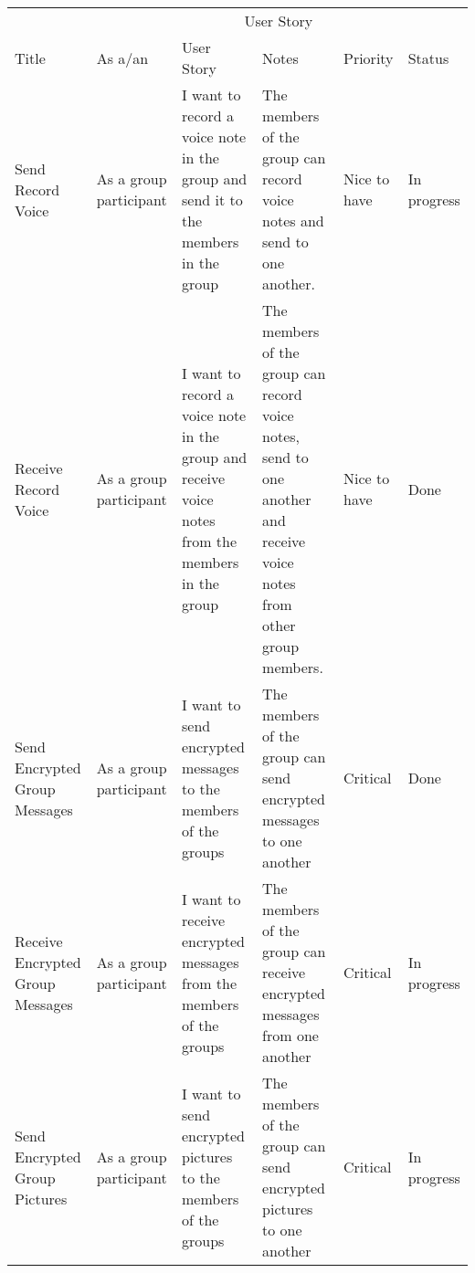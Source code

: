 \documentclass[a4paper]{article}
\begin{document}
\vspace{\baselineskip}
\begin{table} 
\begin{tabular}{p{2cm} p{2.5cm} p{3cm} p{3cm} p{1cm} p{0.75cm}} %
\hline %
& \multicolumn{5}{c}{User Story} \\ %
\cmidrule(l){2-6} %
Title & As a/an & User Story & Notes & Priority & Status\\ %
\hline %

Send Record Voice & As a group participant & I want to record a voice note in the group and send it to the members in the group & The members of the group can record voice notes and send to one another. & Nice to have & In progress\\ \cmidrule(l){2-6} %

Receive Record Voice & As a group participant & I want to record a voice note in the group and receive voice notes from the members in the group & The members of the group can record voice notes, send to one another and receive voice notes from other group members. & Nice to have & Done\\ \cmidrule(l){2-6}%

Send Encrypted Group Messages & As a group participant & I want to send encrypted messages to the members of the groups & The members of the group can send encrypted messages to one another & Critical & Done\\ \cmidrule(l){2-6}%

Receive Encrypted Group Messages & As a group participant & I want to receive encrypted messages from the members of the groups & The members of the group can receive encrypted messages from one another & Critical & In progress\\ \cmidrule(l){2-6}%

Send Encrypted Group Pictures & As a group participant & I want to send encrypted pictures to the members of the groups & The members of the group can send encrypted pictures to one another & Critical & In progress\\ \cmidrule(l){2-6} %


\end{tabular}
\end{table}
\end{document}
